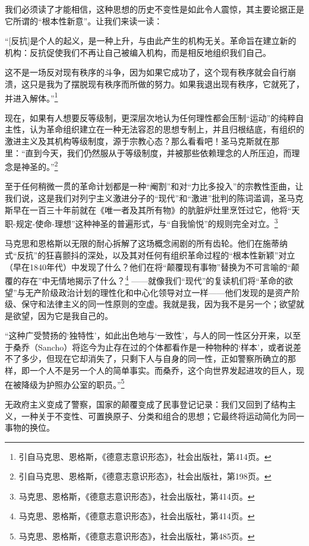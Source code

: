 \documentclass[fontset=fandol, a4paper, 12pt, twoside]{ctexart}
\renewenvironment{quote}
  {\list{}{\rightmargin=0cm \leftmargin=2em}%
   \item\relax\small\kaishu\color{black}}
  {\endlist}
\begin{document}
我们必须读了才能相信，这种思想的历史不变性是如此令人震惊，其主要论据正是它所谓的“根本性新意”。让我们来读一读：

\begin{quote}
“[反抗]是个人的起义，是一种上升，与由此产生的机构无关。革命旨在建立新的机构：反抗促使我们不再让自己被编入机构，而是相反地组织我们自己。

这不是一场反对现有秩序的斗争，因为如果它成功了，这个现有秩序就会自行崩溃，这只是我为了摆脱现有秩序而所做的努力。如果我退出现有秩序，它就死了，并进入解体。”\footnote{引自马克思、恩格斯，《德意志意识形态》，社会出版社，第414页。}
\end{quote}

现在，如果有人想要反等级制，更深层次地认为任何理性都会压制“运动”的纯粹自主性，认为革命组织建立在一种无法容忍的思想专制上，并且归根结底，有组织的激进主义及其机构等级制度，源于宗教心态？那么看看吧！圣马克斯就在那里：“直到今天，我们仍然服从于等级制度，并被那些依赖理念的人所压迫，而理念是神圣的。”\footnote{引自马克思、恩格斯，《德意志意识形态》，社会出版社，第198页。}

至于任何稍微一贯的革命计划都是一种“阉割”和对“力比多投入”的宗教性歪曲，让我们说，这是我们对列宁主义激进分子的“现代”和“激进”批判的陈词滥调，圣马克斯早在一百三十年前就在《唯一者及其所有物》的肮脏炉灶里烹饪过它，他将“天职-规定-使命-理想”这种神圣的普遍形式，与“自我愉悦”的规则完全对立。\footnote{马克思、恩格斯，《德意志意识形态》，社会出版社，第414页。}

马克思和恩格斯以无限的耐心拆解了这场概念闹剧的所有齿轮。他们在施蒂纳式“反抗”的狂喜颤抖的深处，以及其对任何有组织革命过程的“根本性新颖”对立（早在1840年代）中发现了什么？他们在将“颠覆现有事物”替换为不可言喻的“颠覆的存在”中无情地揭示了什么？\footnote{马克思、恩格斯，《德意志意识形态》，社会出版社，第414页。} ——就像我们“现代”的复读机们将“革命的欲望”与无产阶级政治计划的理性化和中心化领导对立一样——他们发现的是资产阶级、保守和法律主义的同一性原则的空虚。我就是我，因为我不是另一个；欲望就是欲望，因为它是我自己的。

\begin{quote}
“这种广受赞扬的‘独特性’，如此出色地与‘一致性’，与人的同一性区分开来，以至于桑乔（Sancho）将迄今为止存在过的个体都看作是一种物种的‘样本’，或者说差不了多少，但现在它却消失了，只剩下人与自身的同一性，正如警察所确立的那样，即一个人不是另一个人的简单事实。而桑乔，这个向世界发起进攻的巨人，现在被降级为护照办公室的职员。”\footnote{马克思、恩格斯，《德意志意识形态》，社会出版社，第485页。}
\end{quote}

无政府主义变成了警察，国家的颠覆变成了民事登记记录：我们又回到了结构主义，一种关于不变性、可置换原子、分类和组合的思想；它最终将运动简化为同一事物的换位。
\end{document}
